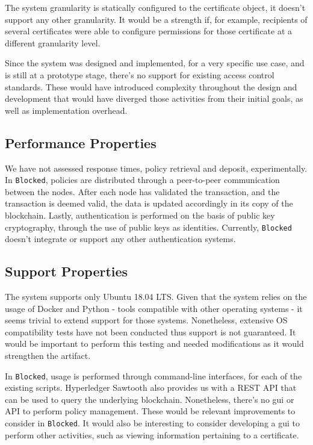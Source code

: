 The system granularity is statically configured to the certificate object, it doesn't support any other granularity. It would be a strength if, for example, recipients of several certificates were able to configure permissions for those certificate at a different granularity level.

Since the system was designed and implemented, for a very specific use case, and is still at a prototype stage, there's no support for existing access control standards. These would have introduced complexity throughout the design and development that would have diverged those activities from their initial goals, as well as implementation overhead.

\subsection{Performance Properties}

We have not assessed response times, policy retrieval and deposit, experimentally. In \texttt{Blocked}, policies are distributed through a peer-to-peer communication between the nodes. After each node has validated the transaction, and the transaction is deemed valid, the data is updated accordingly in its copy of the blockchain. Lastly, authentication is performed on the basis of public key cryptography, through the use of public keys as identities. Currently, \texttt{Blocked} doesn't integrate or support any other authentication systems.

\subsection{Support Properties}

The system supports only Ubuntu 18.04 LTS. Given that the system relies on the usage of Docker and Python - tools compatible with other operating systems - it seems trivial to extend support for those systems. Nonetheless, extensive OS compatibility tests have not been conducted thus support is not guaranteed. It would be important to perform this testing and needed modifications as it would strengthen the artifact.

In \texttt{Blocked}, usage is performed through command-line interfaces, for each of the existing scripts. Hyperledger Sawtooth also provides us with a REST API that can be used to query the underlying blockchain. Nonetheless, there's no \gls{gui} or API to perform policy management. These would be relevant improvements to consider in \texttt{Blocked}. It would also be interesting to consider developing a \gls{gui} to perform other activities, such as viewing information pertaining to a certificate.

